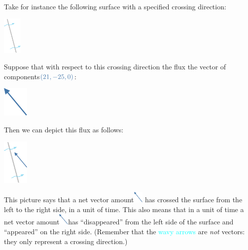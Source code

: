 \documentclass[a4paper,12pt,%
onecolumn,oneside,%
british%
]{memoir}
\renewcommand*{\|}[1][]{\nonscript\:#1\vert\nonscript\:\mathopen{}}
\begin{document}
Take for instance the following surface with a specified crossing direction:\noprelistbreak
\begin{center}
  \medskip
  \includegraphics[height=5em]{images/surface_tilted_crossright.pdf}
\end{center}
Suppose that with respect to this crossing direction the flux the vector of components\enspace$\mathcolor{blue}{(21, -25, 0)}$:\noprelistbreak
\begin{center}
  \medskip
  \includegraphics[height=4em]{images/vec_NW.pdf}
\end{center}
Then we can depict this flux as follows:\noprelistbreak
\begin{center}
  \medskip
\includegraphics[height=6em]{images/flux_vec_right.pdf}%
\end{center}
This picture says that a net vector amount\enspace\includegraphics[align=c,height=1.5em]{images/vec_NW.pdf}\enspace
has crossed the surface from the left to the right side, in a unit of time. This also means that in a unit of time a net vector amount\enspace\includegraphics[align=c,height=1.5em]{images/vec_NW.pdf}\enspace has \enquote{disappeared} from the left side of the surface and \enquote{appeared} on the right side. (Remember that the \textcolor{cyan}{wavy arrows} are \emph{not} vectors: they only represent a crossing direction.)
\end{document}
